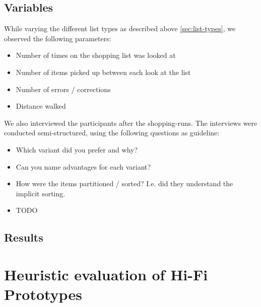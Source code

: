 \documentclass{article}
\begin{document}
\begin{itemize}
\begin{itemize}
\subsection{Variables}
While varying the different list types as described above \ref{sec:list-types}, we observed the following parameters:
\begin{itemize}
    \item Number of times on the shopping list was looked at
    \item Number of items picked up between each look at the list
    \item Number of errors / corrections
    \item Distance walked
\end{itemize}

We also interviewed the participants after the shopping-runs.
The interviews were conducted semi-structured, using the following questions as guideline:
\begin{itemize}
    \item Which variant did you prefer and why?    
    \item Can you name advantages for each variant?
    \item How were the items partitioned / sorted? I.e. did they understand the implicit sorting.
    \item TODO
\end{itemize}

\subsection{Results}


\section{Heuristic evaluation of Hi-Fi Prototypes}


\end{itemize}
\end{itemize}
\end{document}
